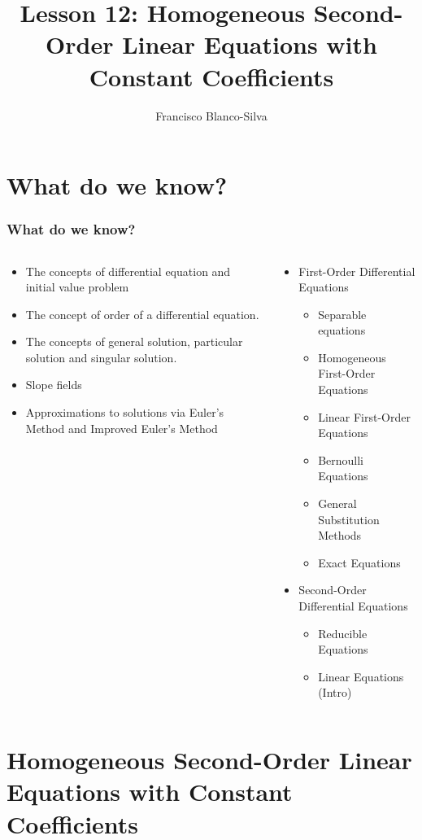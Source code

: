 \documentclass[9pt,xcolor=x11names,compress]{beamer}
\author[Francisco Blanco-Silva]{Francisco Blanco-Silva}
\institute[USC]{University of South Carolina}
\date{
\pgfdeclarelindenmayersystem{Funny curve}{
  \rule{F -> FF+F+F+F+FF}}
	\begin{tikzpicture} 
    \draw [DeepSkyBlue4]
    [l-system={Funny curve, axiom=F+F+F+F, order=4, step=1.5pt, angle=90}]
    lindenmayer system -- cycle; 
	\end{tikzpicture}
}
\title{Lesson 12: Homogeneous Second-Order Linear Equations with Constant Coefficients}
\begin{document}
\frame{\titlepage}

\section{What do we know?}
\begin{frame}\frametitle{What do we know?}
\begin{columns}[T]
\begin{column}{0.45\linewidth}
\begin{itemize}
\item The concepts of \alert{differential equation} and \alert{initial value problem}
\item The concept of \alert{order} of a differential equation.
\item The concepts of \alert{general solution}, \alert{particular solution} and \alert{singular solution}.
\item \alert{Slope fields}
\item Approximations to solutions via \alert{Euler's Method} and \alert{Improved Euler's Method}
\end{itemize} 
\end{column}
\begin{column}{0.55\linewidth}
\begin{itemize}
\item First-Order Differential Equations
\begin{itemize}
\item Separable equations 
\item Homogeneous First-Order Equations 
\item Linear First-Order Equations 
\item Bernoulli Equations 
\item General Substitution Methods
\item Exact Equations 
\end{itemize}
\item Second-Order Differential Equations
\begin{itemize}
	\item Reducible Equations
	\item Linear Equations (Intro)
\end{itemize}
\end{itemize}
\end{column}
\end{columns}
\end{frame}

\section{Homogeneous Second-Order Linear Equations with Constant Coefficients}
\end{document}
